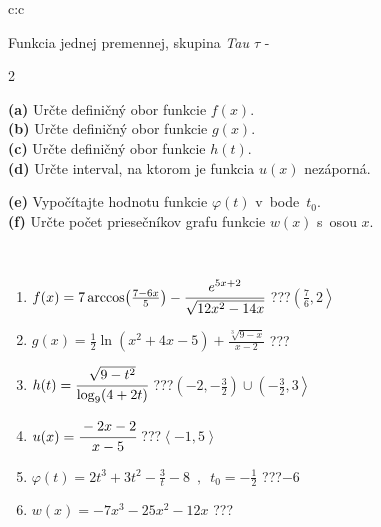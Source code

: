 \documentclass[10pt]{report}
\begin{document}
\begin{tabular}{c:c}
\begin{minipage}[c][104.5mm][t]{0.5\linewidth}
\begin{center}
{\huge Funkcia jednej premennej, skupina \textit{Tau $\tau$} -}\\[5mm]
\begin{minipage}{0.95\linewidth}
\begin{center}
{\small \begin{multicols}{2} \raggedright
\textbf{(a)} Určte definičný obor funkcie \(f(x)\). \\[1mm]
\textbf{(b)} Určte definičný obor funkcie \(g(x)\). \\[1mm]
\textbf{(c)} Určte definičný obor funkcie \(h(t)\). \\[1mm]
\textbf{(d)} Určte interval, na ktorom je funkcia \(u(x)\) nezáporná. \par \columnbreak
\textbf{(e)} Vypočítajte hodnotu funkcie \(\varphi(t)\) v~bode~\(t_0\). \\[1mm]
\textbf{(f)} Určte počet priesečníkov grafu funkcie \(w(x)\) s~osou \(x\). \\[1mm]
\end{multicols}
}
\end{center}
\end{minipage}
\\[4mm]
\begin{minipage}{0.79\linewidth}
\begin{center}
\begin{varwidth}{\linewidth}
\begin{enumerate}
\small
\item $f(x) = 7\arccos\!\left( \frac{7-6x}{5} \right) - \cfrac{e^{5x+2}}{\sqrt{12x^2-14x}}$\quad \dotfill\; ???\;\dotfill \quad $\left(\frac{7}{6} , 2\right\rangle$
\item $g(x) = \frac{1}{2} \ln{\!(x^2+4x-5)}+\frac{\sqrt[3]{9-x}}{x-2}$\quad \dotfill\; ???\;\dotfill {}
\item $h(t) = \cfrac{\sqrt{9-t^2}}{\log_9(4+2t)}$\quad \dotfill\; ???\;\dotfill \quad $\left(-2 , -\frac{3}{2}\right)\cup\left(-\frac{3}{2} , 3\right\rangle$
\item $u(x) = \cfrac{-2x-2}{x-5}$\quad \dotfill\; ???\;\dotfill \quad $\left\langle-1 , 5\right\rangle$
\item $\varphi(t) = 2t^3+3t^2-\frac{3}{t}-8 \enspace , \enspace t_0=-\frac{1}{2}$\quad \dotfill\; ???\;\dotfill \quad $-6$
\item $w(x) = -7x^3-25x^2-12x$\quad \dotfill\; ???\;\dotfill {}
\end{enumerate}

\end{varwidth}
\end{center}
\end{minipage}
\end{center}
\end{minipage}
\end{tabular}
\end{document}
